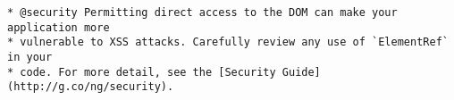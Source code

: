 \begin{verbatim}
* @security Permitting direct access to the DOM can make your application more
* vulnerable to XSS attacks. Carefully review any use of `ElementRef` in your
* code. For more detail, see the [Security Guide](http://g.co/ng/security).
\end{verbatim}
